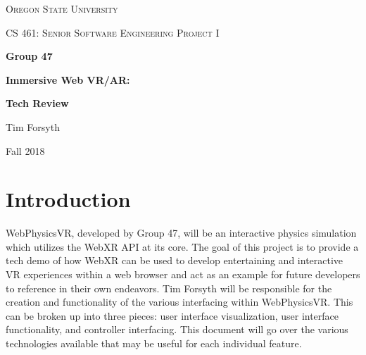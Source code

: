 \documentclass[draftclsnofoot,onecolumn,letterpaper,10pt]{article}
\begin{document}
\begin{titlepage}
    \centering
    {\scshape\LARGE Oregon State University \par}
    \vspace{1cm}
    {\scshape\Large CS 461: Senior Software Engineering Project I\par}
    \vspace{1.5cm}
    {\Large\bfseries Group 47 \par}
    {\Large\bfseries Immersive Web VR/AR:\par}
    {\huge\bfseries Tech Review\par}
    \vspace{2cm}
    {\Large Tim Forsyth\par}
    \vfill

    \begin{abstract}
This document is a review of the potential technologies that could be used in the development of the project for Capstone Group 47, WebPhysicsVR. Inside is a review of potential frameworks, tools, libraries and APIs that could be used in generating the user interfaces, as well as implementing functionality to said interfaces and user controller support. A few of the technologies that will be reviewed are A-Frame, ReactVR, Three.js, Gamepad API, Reticulum, and JavaScript. 
    \end{abstract}

    \vfill

    {\large Fall 2018\par}
\end{titlepage}



\section{Introduction}
WebPhysicsVR, developed by Group 47, will be an interactive physics simulation which utilizes the WebXR API at its core. The goal of this project is to provide a tech demo of how WebXR can be used to develop entertaining and interactive VR experiences within a web browser and act as an example for future developers to reference in their own endeavors. Tim Forsyth will be responsible for the creation and functionality of the various interfacing within WebPhysicsVR. This can be broken up into three pieces: user interface visualization, user interface functionality, and controller interfacing. This document will go over the various technologies available that may be useful for each individual feature.
\end{document}
